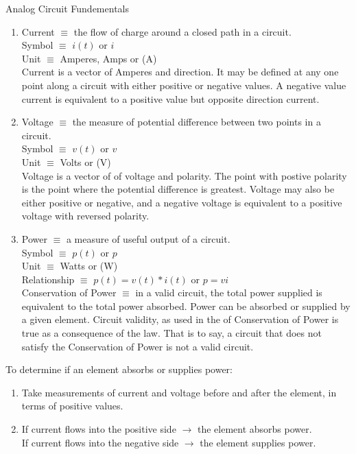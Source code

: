 \documentclass{article}
\begin{document}
\noindent
\Large
Analog Circuit Fundementals\\
\normalsize
\noindent

\begin{enumerate}
  \item {
  Current $\equiv$ the flow of charge around a closed path in a circuit.\\
  Symbol $\equiv$ $i(t)$ or $i$\\
  Unit $\equiv$ Amperes, Amps or (A)\\
  Current is a vector of Amperes and direction. It may be defined at any one point along a circuit with either positive or negative values. A negative value current is equivalent to a positive value but opposite direction current.
  }
  \item {
  Voltage $\equiv$ the measure of potential difference between two points in a circuit.\\
  Symbol $\equiv$ $v(t)$ or $v$\\
  Unit $\equiv$ Volts or (V)\\
  Voltage is a vector of of voltage and polarity. The point with postive polarity is the point where the potential difference is greatest. Voltage may also be either positive or negative, and a negative voltage is equivalent to a positive voltage with reversed polarity.
  }
  \item {
  Power $\equiv$ a measure of useful output of a circuit.\\
  Symbol $\equiv$ $p(t)$ or $p$\\
  Unit $\equiv$ Watts or (W)\\
  Relationship $\equiv$ $p(t) = v(t) * i(t)$ or $p = vi$\\
  Conservation of Power $\equiv$ in a valid circuit, the total power supplied is equivalent to the total power absorbed.
  Power can be absorbed or supplied by a given element. Circuit validity, as used in the of Conservation of Power is true as a consequence of the law. That is to say, a circuit that does not satisfy the Conservation of Power is not a valid circuit.
  }
\end{enumerate}

\noindent
To determine if an element absorbs or supplies power:
\begin{enumerate}
  \item Take measurements of current and voltage before and after the element, in terms of positive values.
  \item {
  If current flows into the positive side $\to$ the element absorbs power.\\
  If current flows into the negative side $\to$ the element supplies power.
  }
\end{enumerate}
\end{document}
